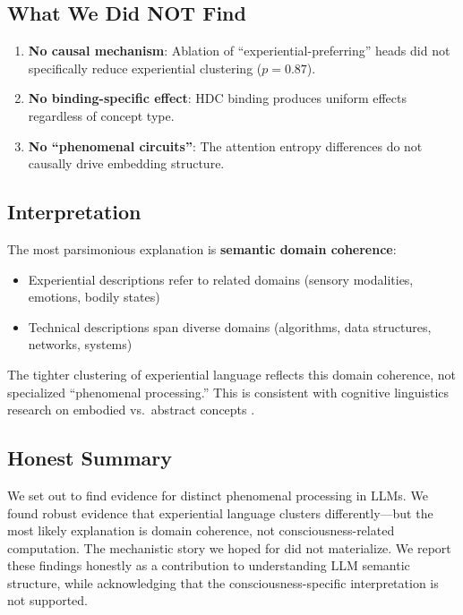 \documentclass[11pt,a4paper]{article}
\newcommand{\pval}{\textit{p}}
\begin{document}
\subsection{What We Did NOT Find}

\begin{enumerate}
    \item \textbf{No causal mechanism}: Ablation of ``experiential-preferring'' heads did not specifically reduce experiential clustering ($\pval=0.87$).
    \item \textbf{No binding-specific effect}: HDC binding produces uniform effects regardless of concept type.
    \item \textbf{No ``phenomenal circuits''}: The attention entropy differences do not causally drive embedding structure.
\end{enumerate}

\subsection{Interpretation}

The most parsimonious explanation is \textbf{semantic domain coherence}:
\begin{itemize}
    \item Experiential descriptions refer to related domains (sensory modalities, emotions, bodily states)
    \item Technical descriptions span diverse domains (algorithms, data structures, networks, systems)
\end{itemize}

The tighter clustering of experiential language reflects this domain coherence, not specialized ``phenomenal processing.'' This is consistent with cognitive linguistics research on embodied vs.\ abstract concepts \citep{barsalou2008grounded}.

\subsection{Honest Summary}

We set out to find evidence for distinct phenomenal processing in LLMs. We found robust evidence that experiential language clusters differently---but the most likely explanation is domain coherence, not consciousness-related computation. The mechanistic story we hoped for did not materialize. We report these findings honestly as a contribution to understanding LLM semantic structure, while acknowledging that the consciousness-specific interpretation is not supported.
\end{document}
